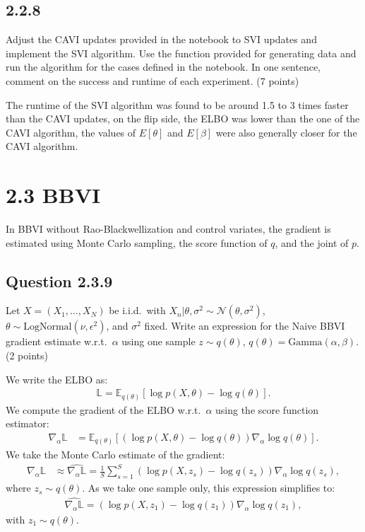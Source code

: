 \documentclass{article}
\begin{document}
\begin{multicols}{2}
\subsection*{2.2.8}
Adjust the CAVI updates provided in the notebook to SVI updates and implement the SVI algorithm. Use the function provided for generating data and run the algorithm for the cases defined in the notebook. In one sentence, comment on the success and runtime of each experiment. (7 points)\bigskip

The runtime of the SVI algorithm was found to be around 1.5 to 3 times faster than the CAVI updates, on the flip side, the ELBO was lower
than the one of the CAVI algorithm, the values of $E[\theta]$ and $E[\beta]$ were also generally closer for the CAVI algorithm.    


\section*{2.3 BBVI}
    In BBVI without Rao-Blackwellization and control variates, the gradient is estimated using Monte Carlo sampling, the score function of \(q\), and the joint of \(p\).

    \subsection*{Question 2.3.9}
    Let \(X = (X_1, \dots, X_N)\) be i.i.d.\ with \(X_n | \theta, \sigma^2 \sim \mathcal{N}(\theta, \sigma^2)\), \(\theta \sim \text{LogNormal}(\nu, \epsilon^2)\), and \(\sigma^2\) fixed. Write an expression for the Naive BBVI gradient estimate w.r.t.\ \(\alpha\) using one sample \(z \sim q(\theta)\), \(q(\theta) = \text{Gamma}(\alpha, \beta)\). (2 points)\bigskip 

    We write the ELBO as:
    \begin{align*}
        \mathbb{L} = \mathbb{E}_{q(\theta)}\left[\log p(X, \theta) - \log q(\theta)\right].
    \end{align*}
    We compute the gradient of the ELBO w.r.t.\ \(\alpha\) using the score function estimator:
    \begin{align*}
        \nabla_\alpha \mathbb{L} &= \mathbb{E}_{q(\theta)}\left[(\log p(X, \theta) - \log q(\theta)) \nabla_\alpha \log q(\theta) \right].
    \end{align*}
    We take the Monte Carlo estimate of the gradient:
    \begin{align*}
        \nabla_\alpha \mathbb{L} &\approx \widehat{\nabla_\alpha \mathbb{L}} = \frac{1}{S}\sum_{s=1}^{S}(\log p(X, z_s) - \log q(z_s)) \nabla_\alpha \log q(z_s),
    \end{align*}
    where \(z_s \sim q(\theta)\). As we take one sample only, this expression simplifies to:
    \begin{align*}
        \widehat{\nabla_\alpha \mathbb{L}} = (\log p(X, z_1) - \log q(z_1)) \nabla_\alpha \log q(z_1),
    \end{align*}
    with \(z_1 \sim q(\theta)\).


\end{multicols}
\end{document}
